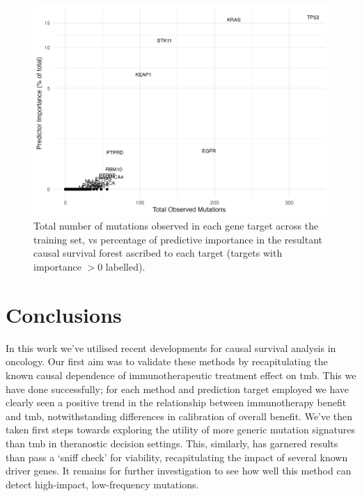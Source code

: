 \documentclass[../thesis.tex]{subfiles}
\begin{document}
\begin{figure}[!tpb] 
\centering
\includegraphics[width=\textwidth]{figures/chapter4/immuno_importance_vs_rate_panel.png}
\caption{Total number of mutations observed in each gene target across the training set, vs  percentage of predictive importance in the resultant causal survival forest ascribed to each target (targets with importance $>0$ labelled).  \label{fig:immuno_importance_vs_rate_panel}}
\end{figure}

\section{Conclusions}
In this work we've utilised recent developments for causal survival analysis in oncology. Our first aim was to validate these methods by recapitulating the known causal dependence of immunotherapeutic treatment effect on \gls{tmb}. This we have done successfully; for each method and prediction target employed we have clearly seen a positive trend in the relationship between immunotherapy benefit and \gls{tmb}, notwithstanding differences in calibration of overall benefit. We've then taken first steps towards exploring the utility of more generic mutation signatures than \gls{tmb} in theranostic decision settings. This, similarly, has garnered results than pass a `sniff check' for viability, recapitulating the impact of several known driver genes. It remains for further investigation to see how well this method can detect high-impact, low-frequency mutations.
\end{document}
